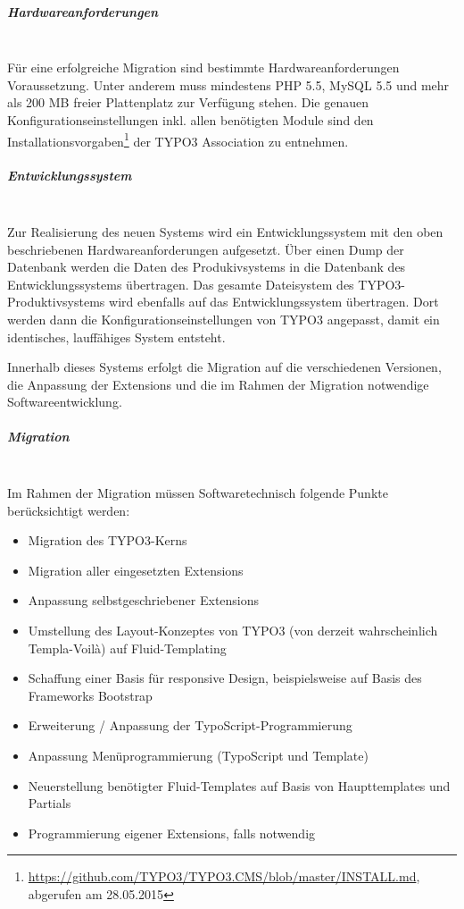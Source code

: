 \subparagraph{Hardwareanforderungen}\mbox{}\\
Für eine erfolgreiche Migration sind bestimmte Hardwareanforderungen Voraussetzung. Unter anderem muss mindestens PHP 5.5, MySQL 5.5 und mehr als 200 MB freier Plattenplatz zur Verfügung stehen. Die genauen Konfigurationseinstellungen inkl. allen benötigten Module sind den Installationsvorgaben\footnote{\url{https://github.com/TYPO3/TYPO3.CMS/blob/master/INSTALL.md}, abgerufen am 28.05.2015} der TYPO3 Association zu entnehmen.

\subparagraph{Entwicklungssystem}\mbox{}\\
Zur Realisierung des neuen Systems wird ein Entwicklungssystem mit den oben beschriebenen Hardwareanforderungen aufgesetzt. Über einen Dump der Datenbank werden die Daten des Produkivsystems in die Datenbank des Entwicklungssystems übertragen. Das gesamte Dateisystem des TYPO3-Produktivsystems wird ebenfalls auf das Entwicklungssystem übertragen. Dort werden dann die Konfigurationseinstellungen von TYPO3 angepasst, damit ein identisches, lauffähiges System entsteht.

Innerhalb dieses Systems erfolgt die Migration auf die verschiedenen Versionen, die Anpassung der Extensions und die im Rahmen der Migration notwendige Softwareentwicklung.

\subparagraph{Migration}\mbox{}\\
Im Rahmen der Migration müssen Softwaretechnisch folgende Punkte berücksichtigt werden:
\begin{itemize}
\item Migration des TYPO3-Kerns
\item Migration aller eingesetzten Extensions
\item Anpassung selbstgeschriebener Extensions
\item Umstellung des Layout-Konzeptes von TYPO3 (von derzeit wahrscheinlich Templa-Voilà) auf Fluid-Templating
\item Schaffung einer Basis für responsive Design, beispielsweise auf Basis des Frameworks Bootstrap
\item Erweiterung / Anpassung der TypoScript-Programmierung
\item Anpassung Menüprogrammierung (TypoScript und Template)
\item Neuerstellung benötigter Fluid-Templates auf Basis von Haupttemplates und Partials
\item Programmierung eigener Extensions, falls notwendig
\end{itemize}

